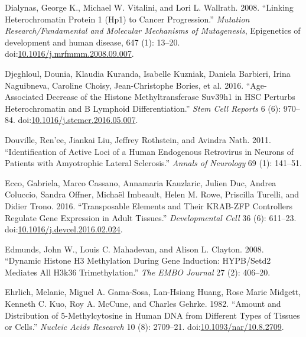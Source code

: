 \documentclass[onehalf,12pt]{beavtex}
\begin{document}
  \hypertarget{ref-DialynasLinkingHeterochromatinProtein2008}{}
  Dialynas, George K., Michael W. Vitalini, and Lori L. Wallrath. 2008.
  ``Linking Heterochromatin Protein 1 (Hp1) to Cancer Progression.''
  \emph{Mutation Research/Fundamental and Molecular Mechanisms of
  Mutagenesis}, Epigenetics of development and human disease, 647 (1):
  13--20.
  doi:\href{https://doi.org/10.1016/j.mrfmmm.2008.09.007}{10.1016/j.mrfmmm.2008.09.007}.
  
  \hypertarget{ref-DjeghloulAgeAssociatedDecreaseHistone2016}{}
  Djeghloul, Dounia, Klaudia Kuranda, Isabelle Kuzniak, Daniela Barbieri,
  Irina Naguibneva, Caroline Choisy, Jean-Christophe Bories, et al. 2016.
  ``Age-Associated Decrease of the Histone Methyltransferase Suv39h1 in
  HSC Perturbs Heterochromatin and B Lymphoid Differentiation.''
  \emph{Stem Cell Reports} 6 (6): 970--84.
  doi:\href{https://doi.org/10.1016/j.stemcr.2016.05.007}{10.1016/j.stemcr.2016.05.007}.
  
  \hypertarget{ref-DouvilleIdentificationactiveloci2011}{}
  Douville, Ren\a'ee, Jiankai Liu, Jeffrey Rothstein, and Avindra Nath.
  2011. ``Identification of Active Loci of a Human Endogenous Retrovirus
  in Neurons of Patients with Amyotrophic Lateral Sclerosis.''
  \emph{Annals of Neurology} 69 (1): 141--51.
  
  \hypertarget{ref-EccoTransposableElementsTheir2016}{}
  Ecco, Gabriela, Marco Cassano, Annamaria Kauzlaric, Julien Duc, Andrea
  Coluccio, Sandra Offner, Michaël Imbeault, Helen M. Rowe, Priscilla
  Turelli, and Didier Trono. 2016. ``Transposable Elements and Their
  KRAB-ZFP Controllers Regulate Gene Expression in Adult Tissues.''
  \emph{Developmental Cell} 36 (6): 611--23.
  doi:\href{https://doi.org/10.1016/j.devcel.2016.02.024}{10.1016/j.devcel.2016.02.024}.
  
  \hypertarget{ref-EdmundsDynamichistoneH32008a}{}
  Edmunds, John W., Louis C. Mahadevan, and Alison L. Clayton. 2008.
  ``Dynamic Histone H3 Methylation During Gene Induction: HYPB/Setd2
  Mediates All H3k36 Trimethylation.'' \emph{The EMBO Journal} 27 (2):
  406--20.
  
  \hypertarget{ref-EhrlichAmountdistribution5methylcytosine1982}{}
  Ehrlich, Melanie, Miguel A. Gama-Sosa, Lan-Hsiang Huang, Rose Marie
  Midgett, Kenneth C. Kuo, Roy A. McCune, and Charles Gehrke. 1982.
  ``Amount and Distribution of 5-Methylcytosine in Human DNA from
  Different Types of Tissues or Cells.'' \emph{Nucleic Acids Research} 10
  (8): 2709--21.
  doi:\href{https://doi.org/10.1093/nar/10.8.2709}{10.1093/nar/10.8.2709}.
  
\end{document}
